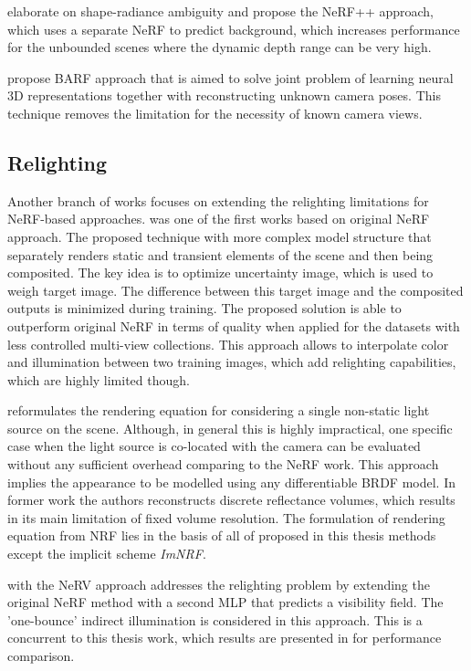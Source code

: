 \cite{zhang2020nerf} elaborate on shape-radiance ambiguity
and propose the NeRF++ approach, which uses a separate NeRF to predict background,
which increases performance for the unbounded scenes where the dynamic depth range can be very high.

\cite{lin2021barf} propose BARF approach that is aimed to solve joint problem
of learning neural 3D representations together with reconstructing unknown camera poses.
This technique removes the limitation for the necessity of known camera views.

\subsection{Relighting}

Another branch of works focuses on extending the relighting limitations for NeRF-based approaches.
\cite{martinbrualla2021nerfw} was one of the first works based on original NeRF approach.
The proposed technique with more complex model structure
that separately renders static and transient elements of the scene
and then being composited.
The key idea is to optimize uncertainty image, which is used to weigh target image.
The difference between this target image and the composited outputs is minimized during training.
The proposed solution is able to outperform original NeRF in terms of quality
when applied for the datasets with less controlled multi-view collections.
This approach allows to interpolate color and illumination between two training images,
which add relighting capabilities, which are highly limited though.

\cite{bi2020neural} reformulates the rendering equation for considering a single non-static light source on the scene.
Although, in general this is highly impractical, one specific case
when the light source is co-located with the camera can be evaluated
without any sufficient overhead comparing to the NeRF work.
This approach implies the appearance to be modelled using any differentiable BRDF model.
In former work \cite{bi2020deep} the authors reconstructs discrete reflectance volumes,
which results in its main limitation of fixed volume resolution.
The formulation of rendering equation from NRF
lies in the basis of all of proposed in this thesis methods except the implicit scheme \textit{ImNRF}.

\cite{nerv2021} with the NeRV approach addresses the relighting problem
by extending the original NeRF method with a second MLP
that predicts a visibility field.
The 'one-bounce' indirect illumination is considered in this approach.
This is a concurrent to this thesis work, which results are presented in  for performance comparison.

